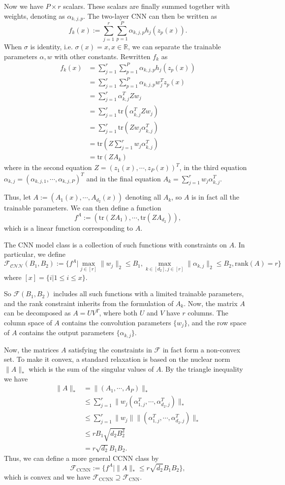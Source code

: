 \documentclass{article}
\begin{document}
Now we have $P\times r$ scalars. These scalars are finally summed together with weights, denoting as $\alpha_{k,j,p}$. The two-layer CNN can then be written as
\[f_k(x):=\sum_{j=1}^{r}\sum_{p=1}^{P}\alpha_{k,j,p}h_j(z_p(x)).\]
When $\sigma$ is identity, i.e. $\sigma(x)=x,x\in\mathbb{R}$, we can separate the trainable parameters $\alpha,w$ with other constants. Rewritten $f_k$ as
\begin{align*}
f_k(x)&=\sum_{j=1}^{r}\sum_{p=1}^{P}\alpha_{k,j,p}h_j(z_p(x))\\
&=\sum_{j=1}^{r}\sum_{p=1}^{P}\alpha_{k,j,p}w_j^Tz_p(x)\\
&=\sum_{j=1}^{r}\alpha_{k,j}^TZw_j\\
&=\sum_{j=1}^{r}\text{tr}(\alpha_{k,j}^TZw_j)\\
&=\sum_{j=1}^{r}\text{tr}(Zw_j\alpha_{k,j}^T)\\
&=\text{tr}(Z\sum_{j=1}^{r}w_j\alpha_{k,j}^T)\\
&=\text{tr}(ZA_k)
\end{align*}
where in the second equation $Z=(z_1(x),\cdots,z_P(x))^T$, in the third equation $\alpha_{k,j}=(\alpha_{k,j,1},\cdots,\alpha_{k,j,P})^T$ and in the final equation $A_k=\sum_{j=1}^{r}w_j\alpha_{k,j}^T$.

Thus, let $A:=(A_1(x),\cdots,A_{d_2}(x))$ denoting all $A_k$, so $A$ is in fact all the trainable parameters. We can then define a function \[f^A:=(\text{tr}(ZA_1),\cdots,\text{tr}(ZA_{d_2})),\] which is a linear function corresponding to $A$.

The CNN model class is a collection of such functions with constraints on $A$. In particular, we define
\[\mathcal{F_{\text{CNN}}}(B_1,B_2):=\lbrace f^A|\max_{j\in[r]}\|w_j\|_2\leq B_1, \max_{k\in[d_2],j\in[r]}\|\alpha_{k,j}\|_2\leq B_2,\text{rank}(A)=r \rbrace\]
where $[x]=\lbrace i|1\leq i\leq x\rbrace.$

So $\mathcal{F}(B_1,B_2)$ includes all such functions with a limited trainable parameters, and the rank constraint inherits from the formulation of $A_k$. Now, the matrix $A$ can be decomposed as $A=UV^T$, where both $U$ and $V$ have $r$ columns. The column space of $A$ contains the convolution parameters $\lbrace w_j\rbrace$, and the row space of $A$ contains the output parameters $\lbrace\alpha_{k,j}\rbrace$.

Now, the matrices $A$ satisfying the constraints in $\mathcal{F}$ in fact form a non-convex 	set. To make it convex, a standard relaxation is based on the nuclear norm $\|A\|_*$ which is the sum of the singular values of $A$. By the triangle inequality we have
\begin{align*}
\|A\|_*&=\|(A_1,\cdots,A_P)\|_*\\
&\leq\sum_{j=1}^r\|w_j(\alpha_{1,j}^T,\cdots,\alpha_{d_2,j}^T)\|_*\\
&\leq\sum_{j=1}^r\|w_j\|\|(\alpha_{1,j}^T,\cdots,\alpha_{d_2,j}^T)\|_*\\
&\leq rB_1\sqrt{d_2B_2^2}\\
&=r\sqrt{d_2}B_1B_2.
\end{align*}
Thus, we can define a more general CCNN class by
\[\mathcal{F}_{\text{CCNN}}:=\lbrace f^A|\|A\|_*\leq r\sqrt{d_2}B_1B_2\rbrace,\]
which is convex and we have $\mathcal{F}_{\text{CCNN}}\supseteq\mathcal{F}_{\text{CNN}}$.
\end{document}
